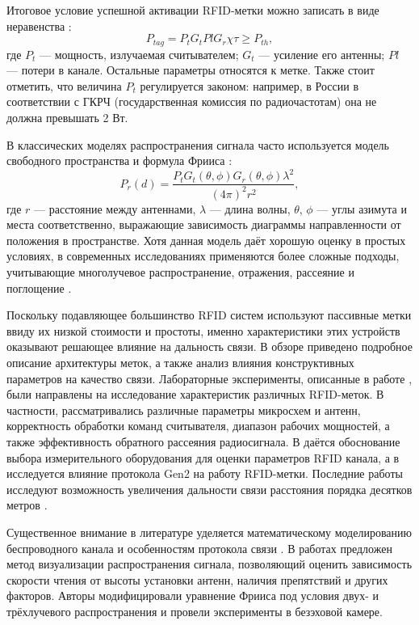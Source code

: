 \documentclass[12pt]{article}
\theoremstyle{definition}
\begin{document}
Итоговое условие успешной активации RFID-метки можно записать в виде неравенства \cite{Rao2008}:
\begin{equation}\label{eq:power}
    P_{tag} = P_tG_tPlG_r\chi\tau\geq P_{th},
\end{equation}
где \(P_t\) — мощность, излучаемая считывателем; \(G_t\) — усиление его антенны; \(Pl\) — потери в канале. Остальные параметры относятся к метке. Также стоит отметить, что величина \(P_t\) регулируется законом: например, в России в соответствии с ГКРЧ (государственная комиссия по радиочастотам) она не должна превышать 2 Вт.

В классических моделях распространения сигнала часто используется модель свободного пространства и формула Фрииса \cite{Marrocco}:
\begin{equation}\label{eq:friis}
    P_r(d)=\frac{P_tG_t(\theta,\phi)G_r(\theta,\phi)\lambda^2}{(4\pi)^2r^2},
\end{equation}
где \(r\) — расстояние между антеннами, \(\lambda\) — длина волны, \(\theta\), \(\phi\) — углы азимута и места соответственно, выражающие зависимость диаграммы направленности от положения в пространстве. Хотя данная модель даёт хорошую оценку в простых условиях, в современных исследованиях применяются более сложные подходы, учитывающие многолучевое распространение, отражения, рассеяние и поглощение \cite{Alhassoun2019}.

Поскольку подавляющее большинство RFID систем используют пассивные метки ввиду их низкой стоимости и простоты, именно характеристики этих устройств оказывают решающее влияние на дальность связи. В обзоре \cite{MarrocMarroccoG} приведено подробное описание архитектуры меток, а также анализ влияния конструктивных параметров на качество связи. Лабораторные эксперименты, описанные в работе \cite{Mayer2007}, были направлены на исследование характеристик различных RFID-меток. В частности, рассматривались различные параметры микросхем и антенн, корректность обработки команд считывателя, диапазон рабочих мощностей, а также эффективность обратного рассеяния радиосигнала. В \cite{Nikitin2012} даётся обоснование выбора измерительного оборудования для оценки параметров RFID канала, а в \cite{Nikitin2009} исследуется влияние протокола Gen2 \cite{StdGen2} на работу RFID-метки. Последние работы исследуют возможность увеличения дальности связи расстояния порядка десятков метров \cite{Rocha2024, Bendavid2024}.

Существенное внимание в литературе уделяется математическому моделированию беспроводного канала и особенностям протокола связи \cite{ElAbsi2023, Padmal2024}. В работах \cite{Banerjee2007, Banerjee2008} предложен метод визуализации распространения сигнала, позволяющий оценить зависимость скорости чтения от высоты установки антенн, наличия препятствий и других факторов. Авторы модифицировали уравнение Фрииса под условия двух- и трёхлучевого распространения и провели эксперименты в безэховой камере.
\end{document}

